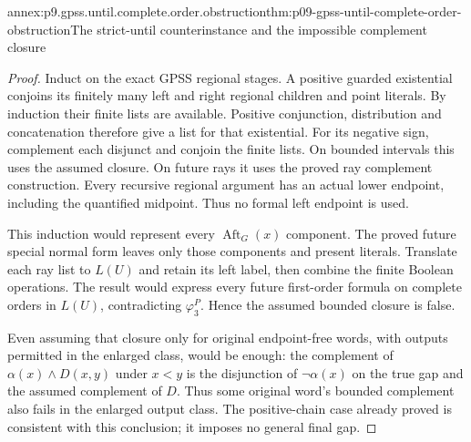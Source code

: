 \begin{annexitem}{annex:p9.gpss.until.complete.order.obstruction}{thm:p09-gpss-until-complete-order-obstruction}{The strict-until counterinstance and the impossible complement closure}
\begin{proof}
Induct on
the exact
GPSS regional
stages. A
positive guarded
existential
conjoins its
finitely many
left and
right regional
children and
point literals.
By induction
their finite
lists are
available.
Positive
conjunction,
distribution
and concatenation
therefore give
a list for
that existential.
For its negative
sign, complement
each disjunct
and conjoin
the finite
lists. On
bounded intervals
this uses
the assumed
closure. On
future rays
it uses the
proved ray
complement
construction.
Every recursive
regional argument
has an actual
lower endpoint,
including the
quantified
midpoint.
Thus no formal
left endpoint
is used.

This induction
would represent
every \(\operatorname{Aft}_G(x)\)
component. The
proved future
special normal
form leaves
only those
components and
present literals.
Translate each
ray list to
\(L(U)\) and
retain its
left label,
then combine
the finite
Boolean operations.
The result
would express
every future
first-order
formula on
complete orders
in \(L(U)\),
contradicting
\(\varphi_3^P\).
Hence the
assumed bounded
closure is
false.

Even assuming
that closure
only for
original
endpoint-free
words, with
outputs permitted
in the enlarged
class, would
be enough:
the complement
of \(\alpha(x)\land D(x,y)\)
under \(x<y\)
is the disjunction
of \(\neg\alpha(x)\)
on the true
gap and
the assumed
complement of
\(D\). Thus
some original
word's bounded
complement also
fails in the
enlarged output
class. The
positive-chain
case already
proved is
consistent with
this conclusion;
it imposes no
general final
gap.
\end{proof}
\end{annexitem}

